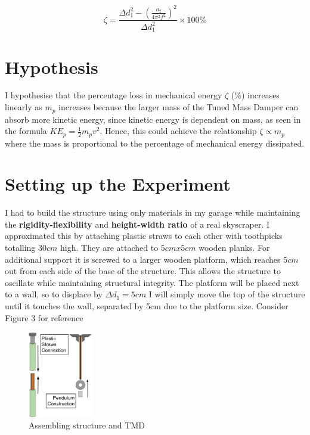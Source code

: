 \documentclass[11pt]{article}
\begin{document}
\begin{equation}
    \label{eqn:zeta}
    \zeta=\frac{\Delta d_1^2-(\frac{a_2}{4\pi^2f^2})^2}{\Delta d_1^2} \times 100\%
\end{equation}

\section{Hypothesis}
I hypothesise that the percentage loss in mechanical energy $\zeta$ (\%) increases linearly as $m_p$ increases because the larger mass of the Tuned Mass Damper can absorb more kinetic energy, since kinetic energy is dependent on mass, as seen in the formula $KE_p=\frac{1}{2}m_pv^2$. Hence, this could achieve the relationship $\zeta \propto m_p$ where the mass is proportional to the percentage of mechanical energy dissipated.

\section{Setting up the Experiment}

I had to build the structure using only materials in my garage while maintaining the\textbf{ rigidity-flexibility} and\textbf{ height-width ratio} of a real skyscraper. I approximated this by attaching plastic straws to each other with toothpicks totalling $30cm$ high. They are attached to $5cm x 5cm$ wooden planks. For additional support it is screwed to a larger wooden platform, which reaches $5cm$ out from each side of the base of the structure. This allows the structure to oscillate while maintaining structural integrity. The platform will be placed next to a wall, so to displace by $\Delta d_1 = 5cm$ I will simply move the top of the structure until it touches the wall, separated by 5cm due to the platform size. Consider Figure 3 for reference

\begin{figure}
\centering
\includegraphics[width=0.25\textwidth]{img/fig3.jpg}
\caption{\label{fig:3}Assembling structure and TMD}
\vspace{-30pt}
\end{figure}
\end{document}
